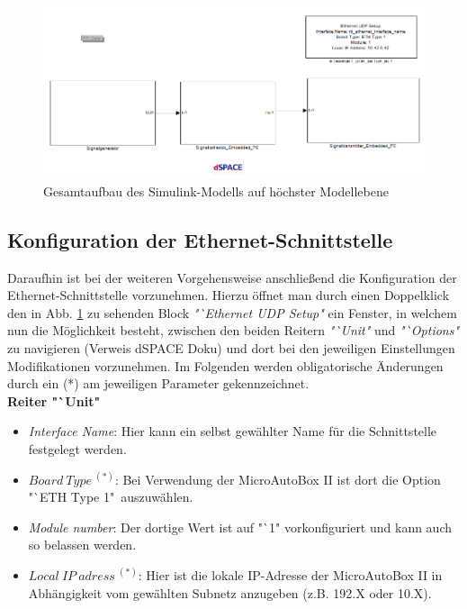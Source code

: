 \documentclass[fontsize = 12pt, paper = a4]{scrreprt}
\begin{document}
\begin{figure}[h]
\centering
\includegraphics[scale = 0.65]{topmodell}
\caption[Gesamtaufbau Simulink-Modell]{Gesamtaufbau des Simulink-Modells auf höchster Modellebene}
\label{topmodell}
\end{figure} 

\newpage


\subsection{Konfiguration der Ethernet-Schnittstelle}

Daraufhin ist bei der weiteren Vorgehensweise anschließend die Konfiguration der Ethernet-Schnittstelle vorzunehmen. Hierzu öffnet man durch einen Doppelklick den in Abb. \ref{topmodell} zu sehenden Block \textit{"`Ethernet UDP Setup"} ein Fenster, in welchem nun die Möglichkeit besteht, zwischen den beiden Reitern \textit{"`Unit"} und \textit{"`Options"} zu navigieren (Verweis dSPACE Doku) und dort bei den jeweiligen Einstellungen Modifikationen vorzunehmen. Im Folgenden werden obligatorische Änderungen durch ein (*) am jeweiligen Parameter gekennzeichnet. \\

\textbf{Reiter "`Unit"} 

\begin{itemize}

\item \textit{Interface Name}: Hier kann ein selbst gewählter Name für die Schnittstelle festgelegt werden.

\item \textit{$Board \ Type \ ^{(*)}$}: Bei Verwendung der MicroAutoBox II ist dort die Option \\ "`ETH Type 1"\ auszuwählen.

\item \textit{Module number}: Der dortige Wert ist auf "`1" vorkonfiguriert und kann auch so belassen werden.

\item \textit{$Local \ IP \ adress \ ^{(*)}$}: Hier ist die lokale IP-Adresse der MicroAutoBox II in Abhängigkeit vom gewählten Subnetz  anzugeben (z.B. 192.X oder 10.X).

\end{itemize}
\end{document}
